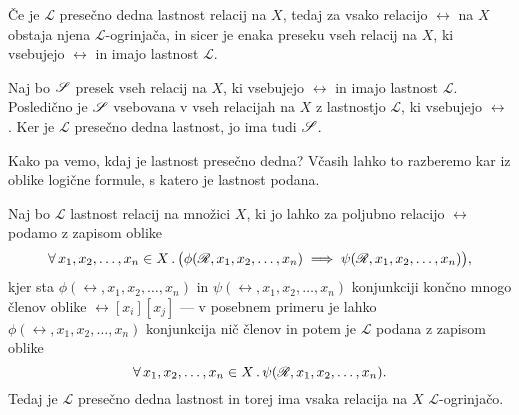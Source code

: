                 \begin{trditev}\label{TRDITEV: obstoj ogrinjače iz presečne dednosti}
                        Če je $\mathscr{L}$ presečno dedna lastnost relacij na $X$, tedaj za vsako relacijo $\rel$ na $X$ obstaja njena $\mathscr{L}$-ogrinjača, in sicer je enaka preseku vseh relacij na $X$, ki vsebujejo $\rel$ in imajo lastnost $\mathscr{L}$.
                \end{trditev}

                \begin{dokaz}
                        Naj bo $\srel$ presek vseh relacij na $X$, ki vsebujejo $\rel$ in imajo lastnost $\mathscr{L}$. Posledično je $\srel$ vsebovana v vseh relacijah na $X$ z lastnostjo $\mathscr{L}$, ki vsebujejo $\rel$. Ker je $\mathscr{L}$ presečno dedna lastnost, jo ima tudi $\srel$.
                \end{dokaz}

                Kako pa vemo, kdaj je lastnost presečno dedna? Včasih lahko to razberemo kar iz oblike logične formule, s katero je lastnost podana.

                \begin{izrek}\label{IZREK: presečna dednost iz logične oblike}
                        Naj bo $\mathscr{L}$ lastnost relacij na množici $X$, ki jo lahko za poljubno relacijo $\rel$ podamo z zapisom oblike
                        \[\all[1]{x_1, x_2, \ldots, x_n}[X]{\phi(\rel, x_1, x_2, \ldots, x_n) \implies \psi(\rel, x_1, x_2, \ldots, x_n)},\]
                        kjer sta $\phi(\rel, x_1, x_2, \ldots, x_n)$ in $\psi(\rel, x_1, x_2, \ldots, x_n)$ konjunkciji končno mnogo členov oblike $\rel[x_i][x_j]$ --- v posebnem primeru je lahko $\phi(\rel, x_1, x_2, \ldots, x_n)$ konjunkcija nič členov in potem je $\mathscr{L}$ podana z zapisom oblike
                        \[\xall{x_1, x_2, \ldots, x_n}[X]{\psi(\rel, x_1, x_2, \ldots, x_n)}.\]
                        Tedaj je $\mathscr{L}$ presečno dedna lastnost in torej ima vsaka relacija na $X$ $\mathscr{L}$-ogrinjačo.
                \end{izrek}

